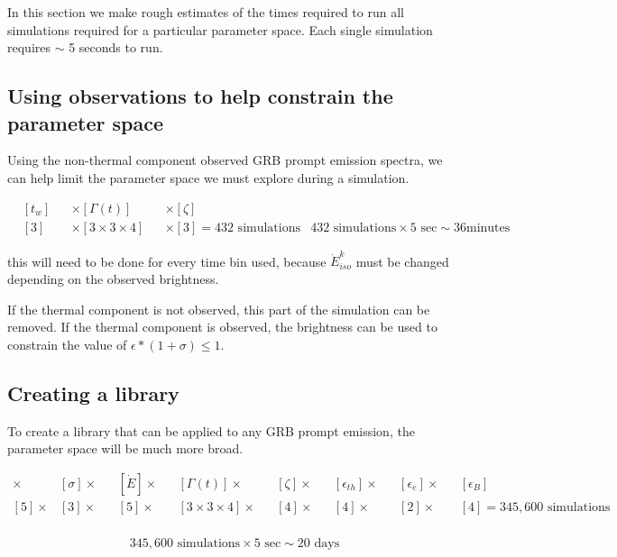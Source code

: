 \documentclass[linenumbers,twocolumn]{aastex631}
\begin{document}
\begin{appendix}
In this section we make rough estimates of the times required to run all simulations required for a particular parameter space. Each single simulation requires $\sim$ 5 seconds to run.

\subsection{Using observations to help constrain the parameter space}

Using the non-thermal component observed GRB prompt emission spectra, we can help limit the parameter space we must explore during a simulation. 

\begin{align}
	& [t_w] &&\times [\Gamma(t)] &&\times [\zeta]  \\
	& [3] &&\times [3\times3\times4] &&\times [3] = 432 \text{ simulations}
	& 432 \text{ simulations} \times 5 \text{ sec} \sim 36 \text{minutes}
\end{align}

this will need to be done for every time bin used, because $\dot{E}^k_{iso}$ must be changed depending on the observed brightness.

If the thermal component is not observed, this part of the simulation can be removed. If the thermal component is observed, the brightness can be used to constrain the value of $\epsilon*(1+\sigma)\leq1$.

\subsection{Creating a library}

To create a library that can be applied to any GRB prompt emission, the parameter space will be much more broad. 

\begin{align}
	[t_w] \times &[\sigma] \times &&[\dot{E}] \times&&[\Gamma(t)] \times&&[\zeta] \times&&[\epsilon_{th}] \times&&[\epsilon_{e}] \times&&[\epsilon_{B}] \\ 
	[5] \times &[3] \times &&[5] \times&&[3\times3\times4] \times&&[4] \times&&[4] \times&&[2] \times&&[4] = 345,600 \text{ simulations} \\
\end{align}

\begin{align}
	345,600 \text{ simulations} \times 5 \text{ sec} \sim 20 \text{ days}
\end{align}


\end{appendix}
\end{document}
